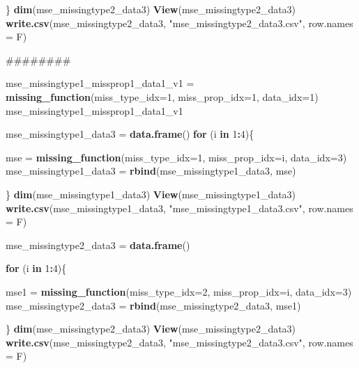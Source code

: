 \documentclass[]{article}
\newenvironment{Shaded}{\begin{snugshade}}{\end{snugshade}}
\newcommand{\KeywordTok}[1]{\textcolor[rgb]{0.13,0.29,0.53}{\textbf{#1}}}
\newcommand{\DataTypeTok}[1]{\textcolor[rgb]{0.13,0.29,0.53}{#1}}
\newcommand{\DecValTok}[1]{\textcolor[rgb]{0.00,0.00,0.81}{#1}}
\newcommand{\StringTok}[1]{\textcolor[rgb]{0.31,0.60,0.02}{#1}}
\newcommand{\ControlFlowTok}[1]{\textcolor[rgb]{0.13,0.29,0.53}{\textbf{#1}}}
\newcommand{\OperatorTok}[1]{\textcolor[rgb]{0.81,0.36,0.00}{\textbf{#1}}}
\newcommand{\NormalTok}[1]{#1}
\begin{document}
\begin{Shaded}
\begin{Highlighting}[]
\NormalTok{\}}
\KeywordTok{dim}\NormalTok{(mse_missingtype2_data3)}
\KeywordTok{View}\NormalTok{(mse_missingtype2_data3)}
\KeywordTok{write.csv}\NormalTok{(mse_missingtype2_data3, }\StringTok{"mse_missingtype2_data3.csv"}\NormalTok{, }\DataTypeTok{row.names =}\NormalTok{ F)}



\NormalTok{######## }

\NormalTok{mse_missingtype1_missprop1_data1_v1 =}\StringTok{ }\KeywordTok{missing_function}\NormalTok{(}\DataTypeTok{miss_type_idx=}\DecValTok{1}\NormalTok{, }\DataTypeTok{miss_prop_idx=}\DecValTok{1}\NormalTok{, }\DataTypeTok{data_idx=}\DecValTok{1}\NormalTok{)}
\NormalTok{mse_missingtype1_missprop1_data1_v1}

\NormalTok{mse_missingtype1_data3 =}\StringTok{ }\KeywordTok{data.frame}\NormalTok{()}
\ControlFlowTok{for}\NormalTok{ (i }\ControlFlowTok{in} \DecValTok{1}\OperatorTok{:}\DecValTok{4}\NormalTok{)\{}
  
\NormalTok{  mse =}\StringTok{ }\KeywordTok{missing_function}\NormalTok{(}\DataTypeTok{miss_type_idx=}\DecValTok{1}\NormalTok{, }\DataTypeTok{miss_prop_idx=}\NormalTok{i, }\DataTypeTok{data_idx=}\DecValTok{3}\NormalTok{)}
\NormalTok{  mse_missingtype1_data3 =}\StringTok{ }\KeywordTok{rbind}\NormalTok{(mse_missingtype1_data3, mse)}
  
\NormalTok{\}}
\KeywordTok{dim}\NormalTok{(mse_missingtype1_data3)}
\KeywordTok{View}\NormalTok{(mse_missingtype1_data3)}
\KeywordTok{write.csv}\NormalTok{(mse_missingtype1_data3, }\StringTok{"mse_missingtype1_data3.csv"}\NormalTok{, }\DataTypeTok{row.names =}\NormalTok{ F)}

\NormalTok{mse_missingtype2_data3 =}\StringTok{ }\KeywordTok{data.frame}\NormalTok{()}

\ControlFlowTok{for}\NormalTok{ (i }\ControlFlowTok{in} \DecValTok{1}\OperatorTok{:}\DecValTok{4}\NormalTok{)\{}
  
\NormalTok{  mse1 =}\StringTok{ }\KeywordTok{missing_function}\NormalTok{(}\DataTypeTok{miss_type_idx=}\DecValTok{2}\NormalTok{, }\DataTypeTok{miss_prop_idx=}\NormalTok{i, }\DataTypeTok{data_idx=}\DecValTok{3}\NormalTok{)}
\NormalTok{  mse_missingtype2_data3 =}\StringTok{ }\KeywordTok{rbind}\NormalTok{(mse_missingtype2_data3, mse1)}
  
\NormalTok{\}}
\KeywordTok{dim}\NormalTok{(mse_missingtype2_data3)}
\KeywordTok{View}\NormalTok{(mse_missingtype2_data3)}
\KeywordTok{write.csv}\NormalTok{(mse_missingtype2_data3, }\StringTok{"mse_missingtype2_data3.csv"}\NormalTok{, }\DataTypeTok{row.names =}\NormalTok{ F)}



\end{Highlighting}
\end{Shaded}
\end{document}
